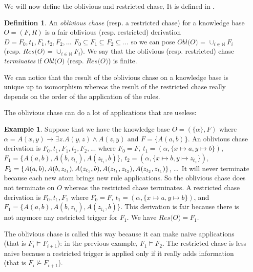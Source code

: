 \documentclass{article}
\theoremstyle{definition}
\newtheorem{definition}{Definition}[section]
\newtheorem{example}{Example}[section]
\theoremstyle{remark}
\def \N {\mathbb N}
\begin{document}
We will now define the oblivious and restricted chase, It is defined in \cite{obl_res}.


\begin{definition}
An \emph{oblivious chase} (resp. a restricted chase) for a knowledge base $O= (F,R)$ is a fair oblivious (resp. restricted) derivation $D=F_0,t_1,F_1,t_2,F_2,\ldots$ $F_0 \subseteq F_1 \subseteq F_2 \subseteq \ldots$ so we can pose \emph{$\textit{Obl(O)}$} = $\cup_{i \in \N}F_i$ (resp. \emph{$\textit{Res(O)}$} = $\cup_{i \in \N}F_i$).
We say that the oblivious (resp. restricted) chase \emph{terminates} if $\textit{Obl(O)}$ (resp. $\textit{Res(O)}$) is finite.
\end{definition}

We can notice that the result of the oblivious chase on a knowledge base is unique up to isomorphism whereas the result of the restricted chase really depends on the order of the application of the rules.

The oblivious chase  can do a lot of applications that are useless: 
\begin{example}
Suppose that we have the knowledge base $O=(\{\alpha\},F)$ where $\alpha = A(x,y) \rightarrow \exists z.A(y,z) \wedge A(z,y)$ and $F =  \{A(a,b)\}$. An oblivious chase derivation is $F_0,t_1,F_1,t_2,F_2,...$ where $F_0 = F$, $t_1=(\alpha,\{x \mapsto a, y \mapsto b\})$, $F_1=\{A(a,b),A(b,z_{t_1}),A(z_{t_1},b)\}$, $t_2=(\alpha,\{x \mapsto b, y \mapsto z_{t_1}\})$, $F_2=\{A(a,b),A(b,z_{t_1}), \\ A(z_{t_1},b), A(z_{t_1},z_{t_2}), A(z_{t_2},z_{t_1})\}$, \ldots\ It will never terminate because each new atom brings new rule applications. So the oblivious chase does not terminate on $O$ whereas the restricted chase terminates. A restricted chase derivation is $F_0,t_1,F_1$ where $F_0 = F$, $t_1=(\alpha,\{x \mapsto a, y \mapsto b\})$, and $F_1=\{A(a,b),A(b,z_{t_1}),A(z_{t_1},b)\}$. This derivation is fair because there is not anymore any restricted trigger for $F_1$. We have $\textit{Res(O)} = F_1$.
\end{example}



The oblivious chase is called this way because it can make naive applications (that is $F_i \vDash F_{i+1}$): in the previous example, $F_1 \models F_2$. The restricted chase is less naive because a restricted trigger is applied only if it really adds information (that is $F_i \nvDash F_{i+1}$).
\end{document}
